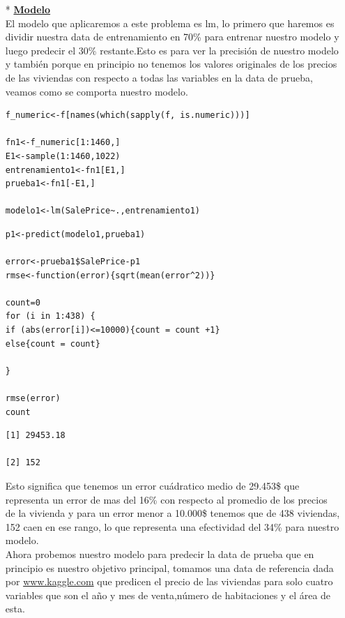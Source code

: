 \documentclass{report}
\begin{document}
\begin{itemize}
\begin{itemize}
\item[*] \textbf{\underline{Modelo}}\\

El modelo que aplicaremos a este problema es lm, lo primero que haremos es dividir nuestra data de entrenamiento en 70\% para entrenar nuestro modelo y luego predecir el 30\% restante.Esto es para ver la precisión de nuestro modelo y también porque en principio no tenemos los valores originales de los precios de las viviendas con respecto a todas las variables en la data de prueba, veamos como se comporta nuestro modelo.\\

\begin{lstlisting}[frame=single]
f_numeric<-f[names(which(sapply(f, is.numeric)))]

fn1<-f_numeric[1:1460,]
E1<-sample(1:1460,1022)
entrenamiento1<-fn1[E1,]
prueba1<-fn1[-E1,]

modelo1<-lm(SalePrice~.,entrenamiento1)
\end{lstlisting}

\begin{lstlisting}[frame=single]
p1<-predict(modelo1,prueba1)

error<-prueba1$SalePrice-p1
rmse<-function(error){sqrt(mean(error^2))}

count=0
for (i in 1:438) {
if (abs(error[i])<=10000){count = count +1}
else{count = count}

}

rmse(error)
count
\end{lstlisting}

\begin{lstlisting}[frame=single]
[1] 29453.18

[2] 152
\end{lstlisting}
\vspace{2mm}

Esto significa que tenemos un error cuádratico medio de 29.453\$ que representa un error de mas del 16\% con respecto al promedio de los precios de la vivienda y para un error menor a 10.000\$ tenemos que de 438 viviendas, 152 caen en ese rango, lo que representa una efectividad del 34\% para nuestro modelo.\\

Ahora probemos nuestro modelo para predecir la data de prueba que en principio es nuestro objetivo principal, tomamos una data de referencia dada por \url{www.kaggle.com} que predicen el precio de las viviendas para solo cuatro variables que son el año y mes de venta,número de habitaciones y el área de esta.\\


\end{itemize}
\end{itemize}
\end{document}
